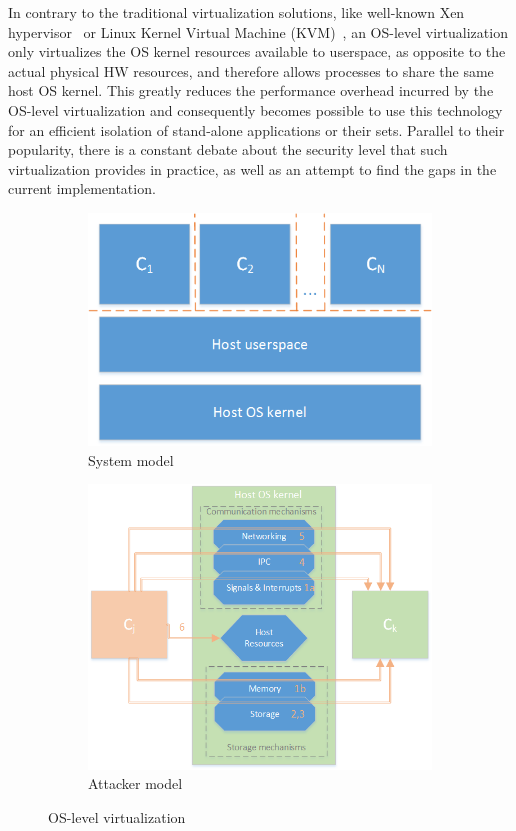 In contrary to the traditional virtualization solutions, like well-known Xen hypervisor~\cite{xenproject} or Linux Kernel Virtual Machine (KVM)~\cite{kvmproject}, an OS-level virtualization only virtualizes the OS kernel resources available to userspace, as opposite to the actual physical HW resources, and therefore allows processes to share the same host OS kernel. This greatly reduces the performance overhead incurred by the OS-level virtualization and consequently becomes possible to use this technology for an efficient isolation of stand-alone applications or their sets. Parallel to their popularity, there is a constant debate about the security level that such virtualization provides in practice, as well as an attempt to find the gaps in the current implementation. 


\begin{figure}[t]
\centering
\begin{subfigure}{.5\textwidth}
  \centering
  \includegraphics[width=0.8\linewidth]{figures/os-virtualization-sys-model.png}
  \caption{System model}
  \label{fig:osv-1}
\end{subfigure}%
\begin{subfigure}{.5\textwidth}
  \centering
  \includegraphics[width=1\linewidth]{figures/OS-virtualization-attacker-model.png}
  \caption{Attacker model}
  \label{fig:osv-2}
\end{subfigure}
\caption{OS-level virtualization}
\label{fig:os-virtualization}
\end{figure}

